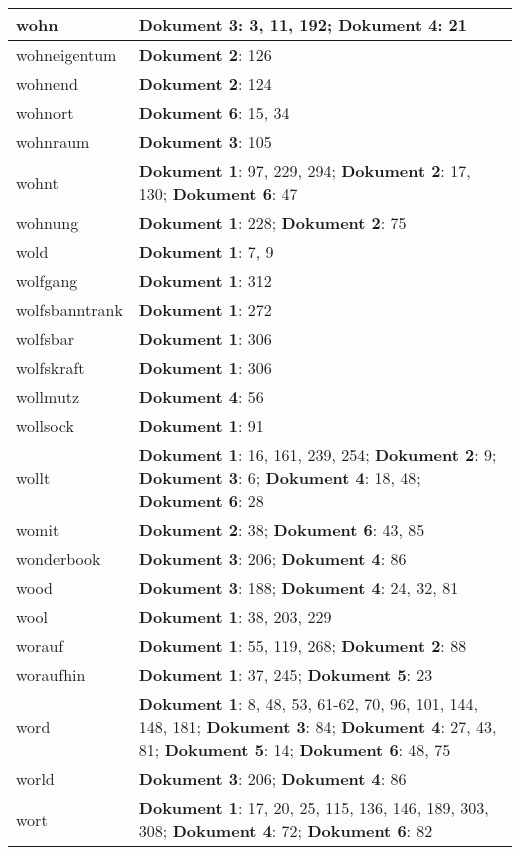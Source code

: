 \documentclass[a5paper]{article}
\begin{document}
\begin{longtable}[l]{|l|p{3in}|}
\hline
wohn & \textbf{Dokument 3}: 3, 11, 192; \textbf{Dokument 4}: 21 \\
\hline
wohneigentum & \textbf{Dokument 2}: 126 \\
\hline
wohnend & \textbf{Dokument 2}: 124 \\
\hline
wohnort & \textbf{Dokument 6}: 15, 34 \\
\hline
wohnraum & \textbf{Dokument 3}: 105 \\
\hline
wohnt & \textbf{Dokument 1}: 97, 229, 294; \textbf{Dokument 2}: 17, 130; \textbf{Dokument 6}: 47 \\
\hline
wohnung & \textbf{Dokument 1}: 228; \textbf{Dokument 2}: 75 \\
\hline
wold & \textbf{Dokument 1}: 7, 9 \\
\hline
wolfgang & \textbf{Dokument 1}: 312 \\
\hline
wolfsbanntrank & \textbf{Dokument 1}: 272 \\
\hline
wolfsbar & \textbf{Dokument 1}: 306 \\
\hline
wolfskraft & \textbf{Dokument 1}: 306 \\
\hline
wollmutz & \textbf{Dokument 4}: 56 \\
\hline
wollsock & \textbf{Dokument 1}: 91 \\
\hline
wollt & \textbf{Dokument 1}: 16, 161, 239, 254; \textbf{Dokument 2}: 9; \textbf{Dokument 3}: 6; \textbf{Dokument 4}: 18, 48; \textbf{Dokument 6}: 28 \\
\hline
womit & \textbf{Dokument 2}: 38; \textbf{Dokument 6}: 43, 85 \\
\hline
wonderbook & \textbf{Dokument 3}: 206; \textbf{Dokument 4}: 86 \\
\hline
wood & \textbf{Dokument 3}: 188; \textbf{Dokument 4}: 24, 32, 81 \\
\hline
wool & \textbf{Dokument 1}: 38, 203, 229 \\
\hline
worauf & \textbf{Dokument 1}: 55, 119, 268; \textbf{Dokument 2}: 88 \\
\hline
woraufhin & \textbf{Dokument 1}: 37, 245; \textbf{Dokument 5}: 23 \\
\hline
word & \textbf{Dokument 1}: 8, 48, 53, 61-62, 70, 96, 101, 144, 148, 181; \textbf{Dokument 3}: 84; \textbf{Dokument 4}: 27, 43, 81; \textbf{Dokument 5}: 14; \textbf{Dokument 6}: 48, 75 \\
\hline
world & \textbf{Dokument 3}: 206; \textbf{Dokument 4}: 86 \\
\hline
wort & \textbf{Dokument 1}: 17, 20, 25, 115, 136, 146, 189, 303, 308; \textbf{Dokument 4}: 72; \textbf{Dokument 6}: 82 \\

\end{longtable}
\end{document}
